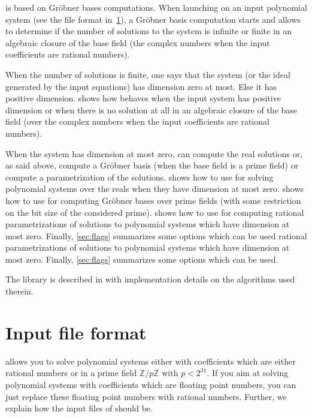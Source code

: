 \documentclass[a4paper,english,11pt]{scrartcl}
\theoremstyle{definition}
\theoremstyle{remark}
\begin{document}
\msolve is based on Gr\"obner bases computations. When launching \msolve on 
an input polynomial system (see the file format in~\cref{sec:input}), a Gr\"obner 
basis computation starts and allows \msolve to determine if the number of solutions 
to the system is infinite or finite in an algebraic closure of the base field 
(the complex numbers when the input coefficients are rational numbers).

When the number of solutions is finite, one says that the system (or the ideal 
generated by the input equations) has dimension zero at most. Else it has positive 
dimension. 
 shows how \msolve behaves when the input system has positive dimension 
or when there is no solution at all in an algebraic closure of the base field (over 
the complex numbers when the input coefficients are rational numbers). 

When the system has dimension at most zero, \msolve can compute the real solutions 
or, as said above, compute a Gr\"obner basis (when the base field is a prime field) 
or compute a parametrization of the solutions. 
 shows how to use \msolve for solving polynomial 
systems over the reals when they have dimension at most zero. 
 shows how to use \msolve for computing 
Gr\"obner bases over prime fields (with some restriction on the bit size of the 
considered prime).  shows how to use \msolve for computing rational 
parametrizations of solutions to polynomial systems which have dimension at most 
zero. Finally, \cref{sec:flags} summarizes some options which can be used rational 
parametrizations of solutions to polynomial systems which have dimension at most 
zero. Finally, \cref{sec:flags} summarizes some options which can be used. 

The \msolve library is described in \cite{msolve} with implementation details on 
the algorithms used therein. 

\section{Input file format}\label{sec:input}

\msolve allows you to solve polynomial systems either with coefficients
which are either rational numbers or in a prime field $\mathbb{Z}/p\mathbb{Z}$
with $p < 2^{31}$. If you aim at solving polynomial systems with coefficients
which are floating point numbers, you can just replace these floating point
numbers with rational numbers. Further, we explain how the input files of
\msolve should be.
\end{document}
